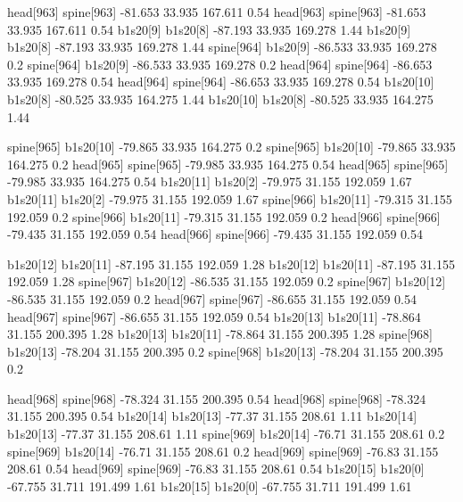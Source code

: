 head[963]    spine[963]    -81.653    33.935    167.611    0.54
head[963]    spine[963]    -81.653    33.935    167.611    0.54
b1s20[9]    b1s20[8]    -87.193    33.935    169.278    1.44
b1s20[9]    b1s20[8]    -87.193    33.935    169.278    1.44
spine[964]    b1s20[9]    -86.533    33.935    169.278    0.2
spine[964]    b1s20[9]    -86.533    33.935    169.278    0.2
head[964]    spine[964]    -86.653    33.935    169.278    0.54
head[964]    spine[964]    -86.653    33.935    169.278    0.54
b1s20[10]    b1s20[8]    -80.525    33.935    164.275    1.44
b1s20[10]    b1s20[8]    -80.525    33.935    164.275    1.44


spine[965]    b1s20[10]    -79.865    33.935    164.275    0.2
spine[965]    b1s20[10]    -79.865    33.935    164.275    0.2
head[965]    spine[965]    -79.985    33.935    164.275    0.54
head[965]    spine[965]    -79.985    33.935    164.275    0.54
b1s20[11]    b1s20[2]    -79.975    31.155    192.059    1.67
b1s20[11]    b1s20[2]    -79.975    31.155    192.059    1.67
spine[966]    b1s20[11]    -79.315    31.155    192.059    0.2
spine[966]    b1s20[11]    -79.315    31.155    192.059    0.2
head[966]    spine[966]    -79.435    31.155    192.059    0.54
head[966]    spine[966]    -79.435    31.155    192.059    0.54


b1s20[12]    b1s20[11]    -87.195    31.155    192.059    1.28
b1s20[12]    b1s20[11]    -87.195    31.155    192.059    1.28
spine[967]    b1s20[12]    -86.535    31.155    192.059    0.2
spine[967]    b1s20[12]    -86.535    31.155    192.059    0.2
head[967]    spine[967]    -86.655    31.155    192.059    0.54
head[967]    spine[967]    -86.655    31.155    192.059    0.54
b1s20[13]    b1s20[11]    -78.864    31.155    200.395    1.28
b1s20[13]    b1s20[11]    -78.864    31.155    200.395    1.28
spine[968]    b1s20[13]    -78.204    31.155    200.395    0.2
spine[968]    b1s20[13]    -78.204    31.155    200.395    0.2


head[968]    spine[968]    -78.324    31.155    200.395    0.54
head[968]    spine[968]    -78.324    31.155    200.395    0.54
b1s20[14]    b1s20[13]    -77.37    31.155    208.61    1.11
b1s20[14]    b1s20[13]    -77.37    31.155    208.61    1.11
spine[969]    b1s20[14]    -76.71    31.155    208.61    0.2
spine[969]    b1s20[14]    -76.71    31.155    208.61    0.2
head[969]    spine[969]    -76.83    31.155    208.61    0.54
head[969]    spine[969]    -76.83    31.155    208.61    0.54
b1s20[15]    b1s20[0]    -67.755    31.711    191.499    1.61
b1s20[15]    b1s20[0]    -67.755    31.711    191.499    1.61


